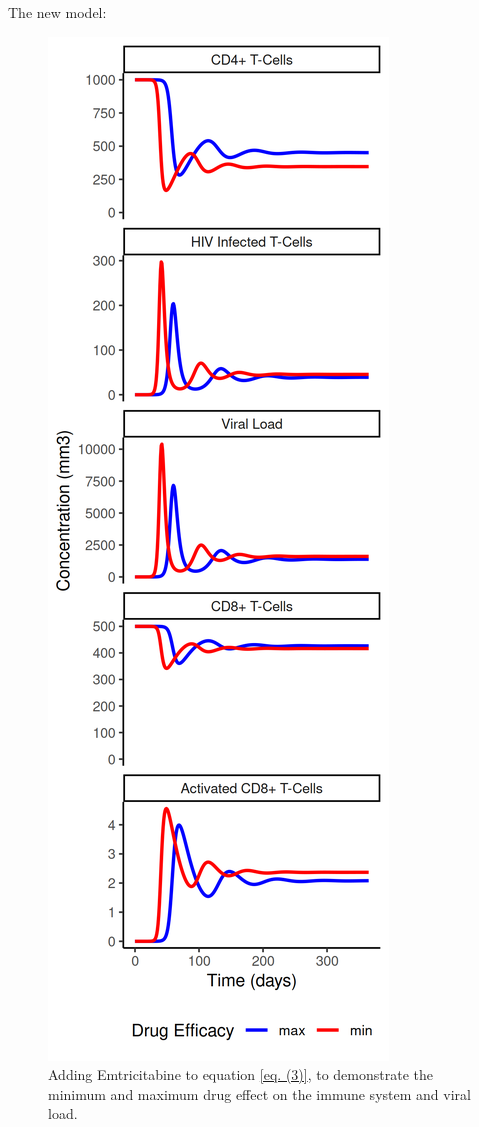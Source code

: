 \documentclass[letterpaper, 11 pt, conference]{ieeeconf}
\begin{document}
The new model:
\begin{figure}[thpb]
      \centering
      \includegraphics[scale = 0.72]{Images/result_ocm_rti_1col.png}
      \caption{Adding Emtricitabine to equation \ref{eq. (3)}, to demonstrate the minimum and maximum drug effect on the immune system and viral load.}
      \label{fig:4}
\end{figure}
\end{document}
